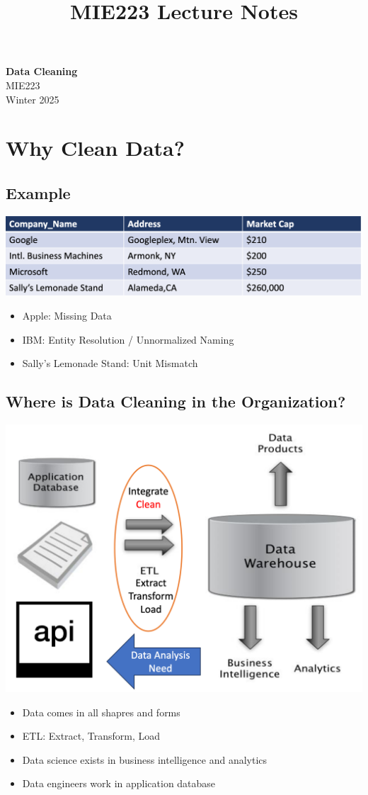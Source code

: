\documentclass[11pt]{article}
\theoremstyle{definition}
\begin{document}
\setcounter{section}{0}
\title{MIE223 Lecture Notes}

\thispagestyle{empty}

\begin{center}
{\LARGE \bf Data Cleaning}\\
{\large MIE223}\\
Winter 2025
\end{center}
\section{Why Clean Data?}
\subsection{Example}
\includegraphics[width=\textwidth]{1.png}
\begin{itemize}
    \item Apple: Missing Data
    \item IBM: Entity Resolution / Unnormalized Naming
    \item Sally's Lemonade Stand: Unit Mismatch
\end{itemize}
\subsection{Where is Data Cleaning in the Organization?}
\includegraphics[width=\textwidth/2]{2.png}
\begin{itemize}
    \item Data comes in all shapres and forms
    \item ETL: Extract, Transform, Load
    \item Data science exists in business intelligence and analytics
    \item Data engineers work in application database
\end{itemize}
\end{document}

